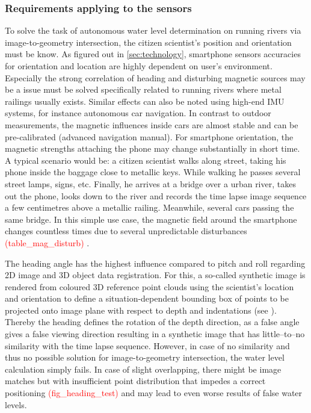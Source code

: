 \documentclass[review]{elsarticle}
\begin{document}
\subsubsection{Requirements applying to the sensors}
\label{sec:water_level_gauging_requirements_sensors}
To solve the task of autonomous water level determination on running rivers via image-to-geometry intersection, the citizen scientist's position and orientation must be know. As figured out in \ref{sec:technology}, smartphone sensors accuracies for orientation and location are highly dependent on user's environment. Especially the strong correlation of heading and disturbing magnetic sources may be a issue must be solved specifically related to running rivers where metal railings usually exists. Similar effects can also be noted using high-end IMU systems, for instance autonomous car navigation. In contrast to outdoor measurements, the magnetic influences inside cars are almost stable and can be pre-calibrated (advanced navigation manual). For smartphone orientation, the magnetic strengths attaching the phone may change substantially in short time. A typical scenario would be: a citizen scientist walks along street, taking his phone inside the baggage close to metallic keys. While walking he passes several street lamps, signs, etc. Finally, he arrives at a bridge over a urban river, takes out the phone, looks down to the river and records the time lapse image sequence a few centimetres above a metallic railing. Meanwhile, several cars passing the same bridge. In this simple use case, the magnetic field around the smartphone changes countless times due to several unpredictable disturbances \textcolor{red}{(table_mag_disturb)} \cite{Blum2013}.

The heading angle has the highest influence compared to pitch and roll regarding 2D image and 3D object data registration. For this, a so-called synthetic image is rendered from coloured 3D reference point clouds using the scientist's location and orientation to define a situation-dependent bounding box of points to be projected onto image plane with respect to depth and indentations (see \cite{Boerner2016}). Thereby the heading defines the rotation of the depth direction, as a false angle gives a false viewing direction resulting in a synthetic image that has little--to--no similarity with the time lapse sequence. However, in case of no similarity and thus no possible solution for image-to-geometry intersection, the water level calculation simply fails. In case of slight overlapping, there might be image matches but with insufficient point distribution that impedes a correct positioning \textcolor{red}{(fig_heading_test)} and may lead to even worse results of false water levels.
\end{document}
